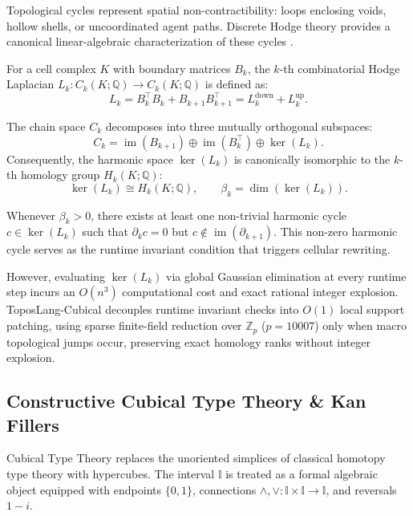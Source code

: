 \documentclass[acmsmall,screen,nonacm]{acmart}
\newcommand{\im}{\operatorname{im}}
\begin{document}
Topological cycles represent spatial non-contractibility: loops enclosing voids, hollow shells, or uncoordinated agent paths. Discrete Hodge theory provides a canonical linear-algebraic characterization of these cycles \cite{eckmann1945}.

\begin{definition}
For a cell complex $K$ with boundary matrices $B_k$, the $k$-th combinatorial Hodge Laplacian $L_k : C_k(K;\mathbb{Q}) \to C_k(K;\mathbb{Q})$ is defined as:
\[
  L_k = B_k^\top B_k + B_{k+1} B_{k+1}^\top = L_k^\mathrm{down} + L_k^\mathrm{up}.
\]
\end{definition}

\begin{theorem}
The chain space $C_k$ decomposes into three mutually orthogonal subspaces:
\[
  C_k = \im(B_{k+1}) \oplus \im(B_k^\top) \oplus \ker(L_k).
\]
Consequently, the harmonic space $\ker(L_k)$ is canonically isomorphic to the $k$-th homology group $H_k(K;\mathbb{Q})$:
\[
  \ker(L_k) \cong H_k(K;\mathbb{Q}), \qquad \beta_k = \dim(\ker(L_k)).
\]
\end{theorem}

Whenever $\beta_k > 0$, there exists at least one non-trivial harmonic cycle $c \in \ker(L_k)$ such that $\partial_k c = 0$ but $c \notin \im(\partial_{k+1})$. This non-zero harmonic cycle serves as the runtime invariant condition that triggers cellular rewriting. 

However, evaluating $\ker(L_k)$ via global Gaussian elimination at every runtime step incurs an $O(n^3)$ computational cost and exact rational integer explosion. ToposLang-Cubical decouples runtime invariant checks into $O(1)$ local support patching, using sparse finite-field reduction over $\mathbb{Z}_p$ ($p = 10007$) only when macro topological jumps occur, preserving exact homology ranks without integer explosion.

\subsection{Constructive Cubical Type Theory \& Kan Fillers}
\label{sec:ctt-kan}

Cubical Type Theory \cite{cohen2016cubical, cchm2017} replaces the unoriented simplices of classical homotopy type theory with hypercubes. The interval $\mathbb{I}$ is treated as a formal algebraic object equipped with endpoints $\{0, 1\}$, connections $\wedge, \vee : \mathbb{I} \times \mathbb{I} \to \mathbb{I}$, and reversals $1 - i$. 
\end{document}
